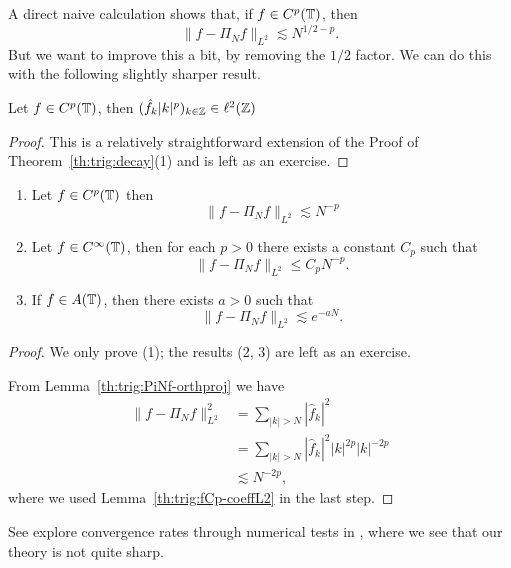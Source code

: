 A direct naive calculation shows that, if $f \in C^p(\mathbb{T})$, then
\[
    \|f - \Pi_N f \|_{L^2} \lesssim N^{1/2-p}.
\]
But we want to improve this a bit, by removing the $1/2$ factor. We can
do this with the following slightly sharper result.

\begin{lemma} \label{th:trig:fCp-coeffL2}
  Let $f \in C^p(\mathbb{T})$, then $(\hat{f}_k |k|^p)_{k \in \mathbb{Z}} \in \ell^2(\mathbb{Z})$
\end{lemma}
\begin{proof}
  This is a relatively straightforward extension of the Proof of
  Theorem~\ref{th:trig:decay}(1) and is left as an exercise.
\end{proof}



\begin{theorem} \label{th:trig:convergence_L2}
  \begin{enumerate} \ilist
  \item Let $f \in C^{p}(\mathbb{T})$ then
  \[
      \|f - \Pi_N f \|_{L^2} \lesssim N^{-p}
  \]
  \item Let $f \in C^\infty(\mathbb{T})$, then for each $p > 0$ there exists a
  constant $C_p$ such that
  \[
      \|f - \Pi_N f \|_{L^2} \leq C_p N^{-p}.
  \]
  \item If $f \in A(\mathbb{T})$, then there exists $a > 0$ such that
  \[
       \| f - \Pi_N f \|_{L^2} \lesssim e^{-a N}.
  \]
  \end{enumerate}
\end{theorem}
\begin{proof}
  We only prove (1); the results (2, 3) are left as an exercise.

  From Lemma~\ref{th:trig:PiNf-orthproj} we have
  \begin{align*}
    \|f-\Pi_N f \|_{L^2}^2
    &= \sum_{|k| > N} |\hat{f}_k|^2 \\
    &= \sum_{|k| > N} |\hat{f}_k|^2 |k|^{2p} |k|^{-2p} \\
    &\lesssim N^{-2p},
  \end{align*}
  where we used Lemma~\ref{th:trig:fCp-coeffL2} in the last step.
\end{proof}

See explore convergence rates through numerical tests in \nbtrig, where we
see that our theory is not quite sharp.

